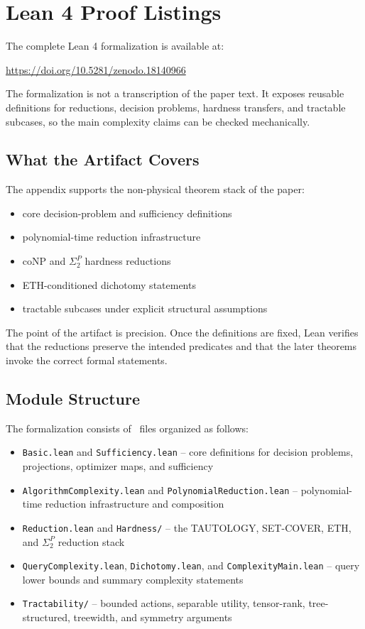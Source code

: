 \section{Lean 4 Proof Listings}\label{app:lean}

The complete Lean 4 formalization is available at:
\begin{center}
\url{https://doi.org/10.5281/zenodo.18140966}
\end{center}

The formalization is not a transcription of the paper text. It exposes reusable definitions for reductions, decision problems, hardness transfers, and tractable subcases, so the main complexity claims can be checked mechanically.

\subsection{What the Artifact Covers}

The appendix supports the non-physical theorem stack of the paper:
\begin{itemize}
\item core decision-problem and sufficiency definitions
\item polynomial-time reduction infrastructure
\item coNP and $\Sigma_2^P$ hardness reductions
\item ETH-conditioned dichotomy statements
\item tractable subcases under explicit structural assumptions
\end{itemize}

The point of the artifact is precision. Once the definitions are fixed, Lean verifies that the reductions preserve the intended predicates and that the later theorems invoke the correct formal statements.

\subsection{Module Structure}

The formalization consists of \LeanTotalFiles\ files organized as follows:

\begin{itemize}
\item \texttt{Basic.lean} and \texttt{Sufficiency.lean} -- core definitions for decision problems, projections, optimizer maps, and sufficiency
\item \texttt{AlgorithmComplexity.lean} and \texttt{PolynomialReduction.lean} -- polynomial-time reduction infrastructure and composition
\item \texttt{Reduction.lean} and \texttt{Hardness/} -- the TAUTOLOGY, SET-COVER, ETH, and $\Sigma_2^P$ reduction stack
\item \texttt{QueryComplexity.lean}, \texttt{Dichotomy.lean}, and \texttt{ComplexityMain.lean} -- query lower bounds and summary complexity statements
\item \texttt{Tractability/} -- bounded actions, separable utility, tensor-rank, tree-structured, treewidth, and symmetry arguments
\end{itemize}

